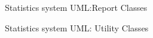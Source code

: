 \documentclass{article}
\begin{document}
\begin{figure}[H]
    \centering
    \begin{center}
    \end{center}
    \caption{Statistics system UML:Report Classes}
    \label{fig:my_label}
\end{figure}
\begin{figure}[H]
    \centering
    \begin{center}
    \end{center}
    \caption{Statistics system UML: Utility Classes}
    \label{fig:my_label}
\end{figure}
\pagebreak
\end{document}
